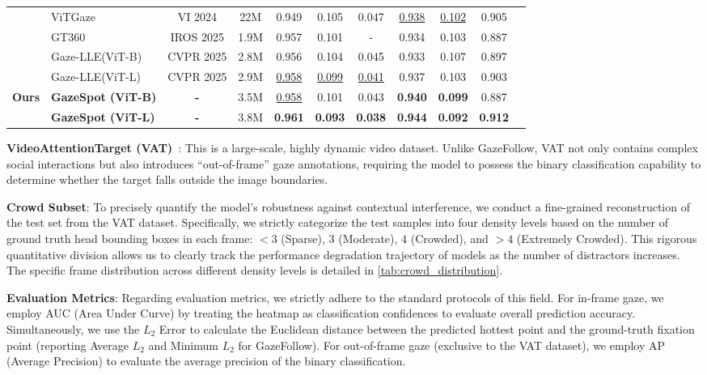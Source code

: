 \documentclass[sigconf,review,anonymous,screen]{acmart}
\begin{document}
\begin{table}[t]
\begin{tabular}{llccccccccc}
    & ViTGaze~\cite{song2024vitgaze}  & VI 2024 & 22M  & 0.949 & 0.105 & 0.047 & \underline{0.938} & \underline{0.102} & 0.905 \\
    & GT360~\cite{dai2025gazetarget360}  & IROS 2025 & 1.9M & 0.957 & 0.101 & - & 0.934 & 0.103 & 0.887 \\
    & Gaze-LLE(ViT-B)~\cite{ryan2025gaze}  & CVPR 2025 & 2.8M & 0.956 & 0.104 & 0.045 & 0.933 & 0.107 & 0.897 \\
    & Gaze-LLE(ViT-L)~\cite{ryan2025gaze}  & CVPR 2025  & 2.9M & \underline{0.958} & \underline{0.099} & \underline{0.041} & 0.937 & 0.103 & 0.903 \\
    \midrule
    \multirow{2}{*}{\textbf{Ours}} 
    & \textbf{GazeSpot (ViT-B)}  & \textbf{-}  & 3.5M & \underline{0.958} & 0.101 & 0.043 & \textbf{0.940} & \textbf{0.099} & 0.887 \\
    & \textbf{GazeSpot (ViT-L)} & \textbf{-} & 3.8M & \textbf{0.961} & \textbf{0.093} & \textbf{0.038} & \textbf{0.944} & \textbf{0.092} & \textbf{0.912} \\
    \bottomrule
  \end{tabular}
\end{table}
\textbf{VideoAttentionTarget (VAT)}~\cite{chong2020detecting}: This is a large-scale, highly dynamic video dataset. Unlike GazeFollow, VAT not only contains complex social interactions but also introduces ``out-of-frame'' gaze annotations, requiring the model to possess the binary classification capability to determine whether the target falls outside the image boundaries.

\textbf{Crowd Subset}: To precisely quantify the model's robustness against contextual interference, we conduct a fine-grained reconstruction of the test set from the VAT dataset. Specifically, we strictly categorize the test samples into four density levels based on the number of ground truth head bounding boxes in each frame: $<3$ (Sparse), $3$ (Moderate), $4$ (Crowded), and $>4$ (Extremely Crowded). This rigorous quantitative division allows us to clearly track the performance degradation trajectory of models as the number of distractors increases. The specific frame distribution across different density levels is detailed in \autoref{tab:crowd_distribution}.

\textbf{Evaluation Metrics}: Regarding evaluation metrics, we strictly adhere to the standard protocols of this field. For in-frame gaze, we employ AUC (Area Under Curve) by treating the heatmap as classification confidences to evaluate overall prediction accuracy. Simultaneously, we use the $L_2$ Error to calculate the Euclidean distance between the predicted hottest point and the ground-truth fixation point (reporting Average $L_2$ and Minimum $L_2$ for GazeFollow). For out-of-frame gaze (exclusive to the VAT dataset), we employ AP (Average Precision) to evaluate the average precision of the binary classification.
\end{document}
